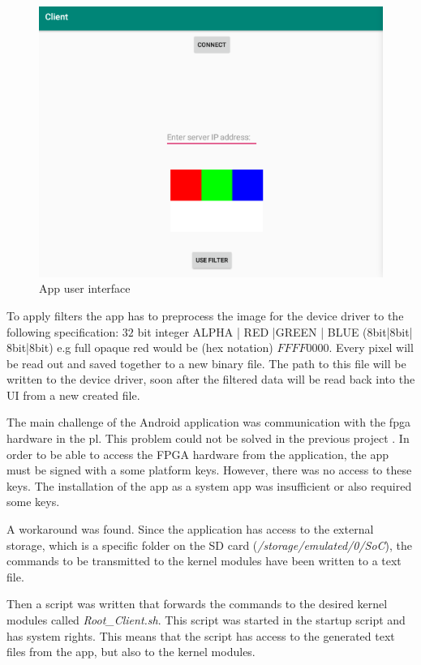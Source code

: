 \begin{figure}[htbp]
    \centering
    \includegraphics[width=1\textwidth]{images/client-screen.png}
    \caption{\label{fig:gui} App user interface}
\end{figure}

To apply filters the app has to preprocess the image for the device driver to the following specification:
$32$ bit integer
ALPHA | RED |GREEN | BLUE ($8$bit|$8$bit|$8$bit|$8$bit) e.g full opaque red would be (hex notation) $FF FF 00 00$. Every pixel will be read out and saved together to a new binary file. 
The path to this file will be written to the device driver, soon after the filtered data will be read back into the UI from a new created file.

\label{ssssec:clientscript}
The main challenge of the Android application was communication with the \gls{fpga} hardware in the \gls{pl}. This problem could not be solved in the previous project \cite{oldrepo}. 
In order to be able to access the FPGA hardware from the application, the app must be signed with a some platform keys. However, there was no access to these keys. The installation of the app as a system app was insufficient or also required some keys.

A workaround was found. Since the application has access to the external storage, which is a specific folder on the SD card (\emph{/storage/emulated/0/SoC}), the commands to be transmitted to the kernel modules have been written to a text file.

Then a script was written that forwards the commands to the desired kernel modules called \emph{Root_Client.sh}. This script was started in the startup script and has system rights. This means that the script has access to the generated text files from the app, but also to the kernel modules.

